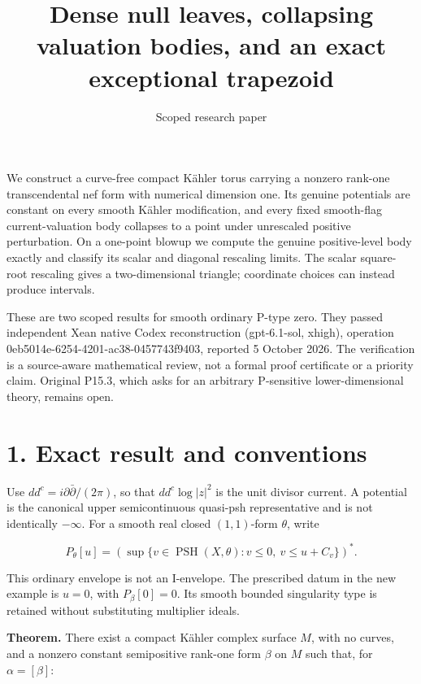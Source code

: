 \documentclass[11pt]{article}
\title{Dense null leaves, collapsing valuation bodies, and an exact exceptional trapezoid}
\author{Scoped research paper}
\date{}
\begin{document}
\maketitle


We construct a curve-\allowbreak{}free compact Kähler torus carrying a nonzero rank-\allowbreak{}one transcendental nef form with numerical dimension one. Its genuine potentials are constant on every smooth Kähler modification, and every fixed smooth-\allowbreak{}flag current-\allowbreak{}valuation body collapses to a point under unrescaled positive perturbation. On a one-\allowbreak{}point blowup we compute the genuine positive-\allowbreak{}level body exactly and classify its scalar and diagonal rescaling limits. The scalar square-\allowbreak{}root rescaling gives a two-\allowbreak{}dimensional triangle; coordinate choices can instead produce intervals.

These are two scoped results for smooth ordinary P-\allowbreak{}type zero. They passed independent Xean native Codex reconstruction (gpt-\allowbreak{}6.1-\allowbreak{}sol, xhigh), operation 0eb5014e-\allowbreak{}6254-\allowbreak{}4201-\allowbreak{}ac38-\allowbreak{}0457743f9403, reported 5 October 2026. The verification is a source-\allowbreak{}aware mathematical review, not a formal proof certificate or a priority claim. Original P15.3, which asks for an arbitrary P-\allowbreak{}sensitive lower-\allowbreak{}dimensional theory, remains open.

\section*{1. Exact result and conventions}

Use $dd^c=i\partial\bar\partial/(2\pi)$, so that $dd^c\log|z|^2$ is the unit divisor current. A potential is the canonical upper semicontinuous quasi-\allowbreak{}psh representative and is not identically $-\infty$. For a smooth real closed $(1,1)$-\allowbreak{}form $\theta$, write

\[P_\theta[u]=\left(\sup\{v\in\operatorname{PSH}(X,\theta):v\leq0,\ v\leq u+C_v\}\right)^*.\]

This ordinary envelope is not an I-\allowbreak{}envelope. The prescribed datum in the new example is $u=0$, with $P_\beta[0]=0$. Its smooth bounded singularity type is retained without substituting multiplier ideals.

\textbf{Theorem.} There exist a compact Kähler complex surface $M$, with no curves, and a nonzero constant semipositive rank-\allowbreak{}one form $\beta$ on $M$ such that, for $\alpha=[\beta]$:
\end{document}
